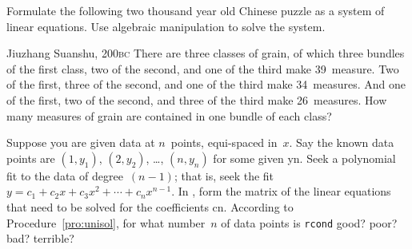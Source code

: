 \begin{exercise} \label{ex:} 
Formulate the following two thousand year old Chinese puzzle as a system of linear equations.
Use algebraic manipulation to solve the system.
\begin{quoted}{Jiuzhang Suanshu, 200\textsc{bc} \cite[p.3]{Chartier2015}}
There are three classes of grain, of which three bundles of the first class, two of the second, and one of the third make 39~measure.
Two of the first, three of the second, and one of the third make 34~measures.
And one of the first, two of the second, and three of the third make 26~measures.
How many measures of grain are contained in one bundle of each class?
\end{quoted}
\end{exercise}



\begin{comment}
Could have project exercises to introduce sensitivity to small errors in applications (experimental computational maths).  Sensitivity quantified in the section on condition number and rank.
\end{comment}





\begin{exercise} \label{ex:} 
Suppose you are given data at \(n\)~points, equi-spaced in~\(x\).
Say the known data points are \((1,y_1)\), \((2,y_2)\), \ldots, \((n,y_n)\) for some given \hlist yn.
Seek a polynomial fit to the data of degree~\((n-1)\); that is, seek the fit \(y=c_1+c_2x+c_3x^2+\cdots+c_{n}x^{n-1}\).
In \script, form the matrix of the linear equations that need to be solved for the coefficients \hlist cn.  
According to Procedure~\ref{pro:unisol}, for what number~\(n\) of data points is \verb|rcond| good? poor? bad? terrible? 
\end{exercise}




